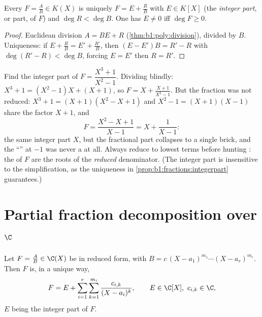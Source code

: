 \begin{proposition}\label{prop:b1:fractions:integerpart}
Every $F = \frac AB \in K(X)$ is uniquely $F = E + \frac RB$ with $E
\in K[X]$ (the \emph{integer part}, or  part, of $F$) and
$\deg R < \deg B$. One has $E \neq 0$ iff $\deg F \geq 0$.
\end{proposition}

\begin{proof}
Euclidean division $A = BE + R$ (\cref{thm:b1:poly:division}), divided
by $B$. Uniqueness: if $E + \frac RB = E' + \frac{R'}{B}$, then $(E -
E')B = R' - R$ with $\deg(R' - R) < \deg B$, forcing $E = E'$ then $R
= R'$.
\end{proof}

\begin{example}\label{ex:b1:fractions:integerpart}
Find the integer part of $F = \dfrac{X^3 + 1}{X^2 - 1}$. Dividing
blindly: $X^3 + 1 = (X^2 - 1)X + (X + 1)$, so $F = X +
\frac{X + 1}{X^2 - 1}$. But the fraction was not reduced: $X^3 + 1
= (X + 1)(X^2 - X + 1)$ and $X^2 - 1 = (X+1)(X-1)$ share the factor
$X + 1$, and
\[
F = \frac{X^2 - X + 1}{X - 1} = X + \frac{1}{X - 1} :
\]
the same integer part $X$, but the fractional part collapses to a
single brick, and the ``'' at $-1$ was never a  at all.
Always reduce to lowest terms before hunting : the  of
$F$ are the roots of the \emph{reduced} denominator. (The integer
part is insensitive to the simplification, as the uniqueness in
\cref{prop:b1:fractions:integerpart} guarantees.)
\end{example}

\section{Partial fraction decomposition over $\C$}

\begin{theorem}\label{thm:b1:fractions:complex}
Let $F = \frac AB \in \C(X)$ be in reduced form, with $B = c\,(X -
a_1)^{m_1} \cdots (X - a_r)^{m_r}$. Then $F$ is, in a unique way,
\[
F = E + \sum_{i=1}^{r} \sum_{k=1}^{m_i}
\frac{c_{i,k}}{(X - a_i)^k},
\qquad E \in \C[X],\ c_{i,k} \in \C ,
\]
$E$ being the integer part of $F$.
\end{theorem}

